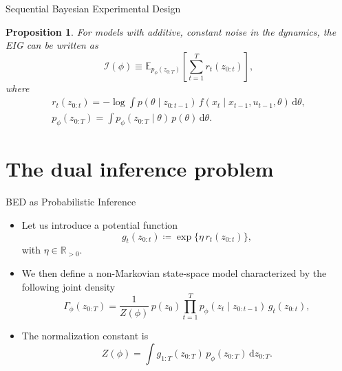 \documentclass[10pt, aspectratio=1610]{beamer}
\newcommand{\dd}{\mathrm{d}}
\newtheorem{proposition}[theorem]{Proposition}
\begin{document}
    \begin{frame}{Sequential Bayesian Experimental Design}
      \begin{proposition}
        For models with additive, constant noise in the dynamics, the EIG can be written as
        \begin{equation}\label{eq:eig_constant_noise}
            \mathcal{I}(\phi) \equiv \mathbb{E}_{p_{\phi}(z_{0:T})} \left[ \sum_{t=1}^T r_{t}(z_{0:t}) \right],
        \end{equation}
        where
        \begin{gather}
          r_{t}(z_{0:t}) = - \log \int p(\theta \mid z_{0:t-1}) \, f(x_t \mid x_{t-1}, u_{t-1}, \theta) \, \dd \theta, \\
          p_\phi(z_{0:T}) = \int p_\phi(z_{0:T} \mid \theta) \, p(\theta) \, \dd \theta.
        \end{gather}
      \end{proposition}
    \end{frame}

  \section{The dual inference problem}

    \begin{frame}{BED as Probabilistic Inference}
      \begin{itemize}[<+->]
        \item Let us introduce a potential function
          \begin{equation}\label{eq:potential-function}
            g_{t}(z_{0:t}) \coloneq \exp \Big\{ \eta \, r_{t}(z_{0:t}) \Big\},
          \end{equation}
          with $\eta \in \mathbb{R}_{>0}$.
        \item We then define a non-Markovian state-space model characterized by the following joint density
          \begin{equation}\label{eq:pathwise_smoothing_trajectory}
            \Gamma_\phi(z_{0:T}) = \frac{1}{Z(\phi)} \, p(z_0) \prod_{t=1}^T p_\phi(z_t \mid z_{0:t-1}) \, g_t(z_{0:t}),
          \end{equation}
        \item The normalization constant is
          \begin{equation}
            Z(\phi) = \int g_{1:T}(z_{0:T}) \, p_\phi(z_{0:T}) \, \dd z_{0:T}.
          \end{equation}
      \end{itemize}
    \end{frame}
\end{document}
